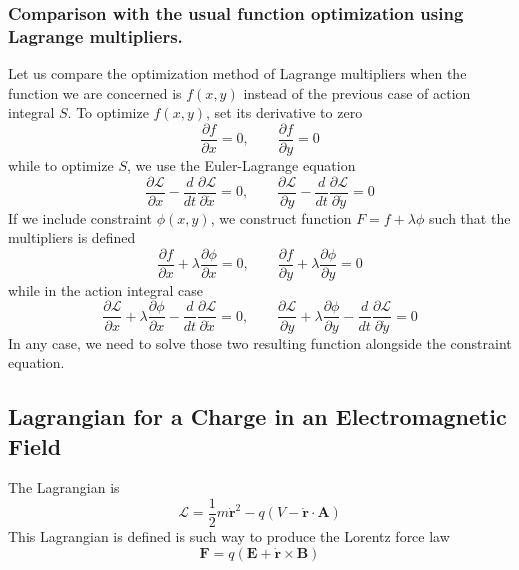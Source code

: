 \documentclass[../../../main.tex]{subfiles}
\begin{document}
\subsubsection{Comparison with the usual function optimization using Lagrange multipliers.}
Let us compare the optimization method of Lagrange multipliers when the function we are concerned is $f(x,y)$ instead of the previous case of action integral $S$.
To optimize $f(x,y)$, set its derivative to zero
\begin{equation*}
	\frac{\partial f}{\partial x}=0,\qquad\frac{\partial f}{\partial y}=0
\end{equation*}
while to optimize $S$, we use the Euler-Lagrange equation
\begin{equation*}
	\frac{\partial \mathcal{L}}{\partial x}-\frac{d}{dt}\frac{\partial\mathcal{L}}{\partial\dot{x}}=0,\qquad\frac{\partial\mathcal{L}}{\partial y}-\frac{d}{dt}\frac{\partial \mathcal{L}}{\partial \dot{y}}=0
\end{equation*}
If we include constraint $\phi(x,y)$, we construct function $F=f+\lambda\phi$ such that the multipliers is defined
\begin{equation*}
	\frac{\partial f}{\partial x}+\lambda\frac{\partial \phi}{\partial x}=0,\qquad\frac{\partial f}{\partial y}+\lambda\frac{\partial \phi}{\partial y}=0
\end{equation*}
while in the action integral case
\begin{equation*}
	\frac{\partial \mathcal{L}}{\partial x}+\lambda\frac{\partial\phi}{\partial x}-\frac{d}{dt}\frac{\partial\mathcal{L}}{\partial\dot{x}}=0,
	\qquad\frac{\partial\mathcal{L}}{\partial y}+\lambda\frac{\partial\phi}{\partial y}-\frac{d}{dt}\frac{\partial \mathcal{L}}{\partial \dot{y}}=0
\end{equation*}
In any case, we need to solve those two resulting function alongside the constraint equation.

\subsection{Lagrangian for a Charge in an Electromagnetic Field}
The Lagrangian is 
\begin{equation*}
	\mathcal{L}=\frac{1}{2}m\dot{\mathbf{r}}^2-q(V-\dot{\mathbf{r}}\cdot \mathbf{A})
\end{equation*}
This Lagrangian is defined is such way to produce the Lorentz force law
\begin{equation*}
	\mathbf{F}=q \left( \mathbf{E}+\dot{\mathbf{r}}\times \mathbf{B} \right) 
\end{equation*}
\end{document}
